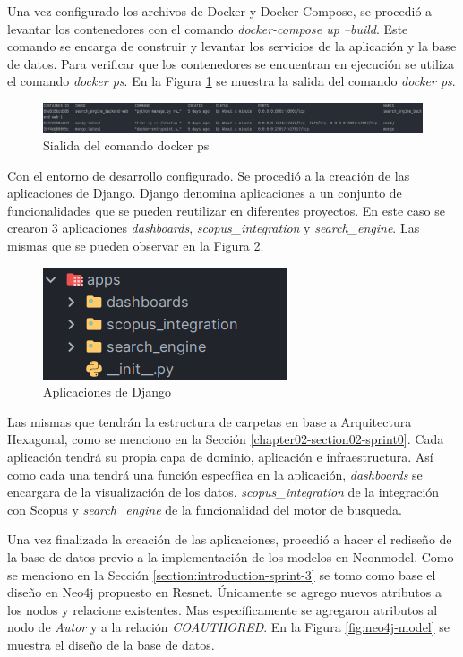 Una vez configurado los archivos de Docker y Docker Compose,
se procedió a levantar los contenedores con el comando \textit{docker-compose up --build}.
Este comando se encarga de construir y levantar los servicios de la aplicación y la base de datos.
Para verificar que los contenedores se encuentran en ejecución se utiliza el comando \textit{docker ps}.
En la Figura \ref{fig:docker-ps} se muestra la salida del comando \textit{docker ps}.

\begin{figure}[H]
    \centering
    \includegraphics[scale=0.4]{../02Figures/02Chapter/Sprints/Sprint-3/docker-ps.png}
    \caption{Sialida del comando docker ps}
    \label{fig:docker-ps}
\end{figure}

Con el entorno de desarrollo configurado. Se procedió a la creación de las aplicaciones de Django.
Django denomina aplicaciones a un conjunto de funcionalidades que se pueden reutilizar en diferentes proyectos.
En este caso se crearon 3 aplicaciones \textit{dashboards}, \textit{scopus\_integration} y \textit{search\_engine}. Las mismas que se pueden observar en la Figura \ref{fig:django-apps}.
\begin{figure}[H]
    \centering
    \includegraphics[scale=1]{../02Figures/02Chapter/Sprints/Sprint-3/django-apps.png}
    \caption{Aplicaciones de Django}
    \label{fig:django-apps}
\end{figure}

Las mismas que tendrán la estructura de carpetas en base a Arquitectura Hexagonal, como se menciono en la Sección \ref{chapter02-section02-sprint0}.
Cada aplicación tendrá su propia capa de dominio, aplicación e infraestructura.
Así como cada una tendrá una función específica en la aplicación, \textit{dashboards} se encargara de la visualización de los datos, \textit{scopus\_integration} de la integración con Scopus y \textit{search\_engine} de la funcionalidad del motor de busqueda.

Una vez finalizada la creación de las aplicaciones,  procedió a hacer el rediseño de la base de datos
previo a la implementación de los modelos en Neonmodel. Como se menciono en la Sección \ref{section:introduction-sprint-3} se tomo como base el diseño en Neo4j propuesto en Resnet.
Únicamente se agrego nuevos atributos a los nodos y relacione existentes.
Mas específicamente se agregaron atributos al nodo de \textit{Autor} y a la relación \textit{COAUTHORED}.
En la Figura \ref{fig:neo4j-model} se muestra el diseño de la base de datos.

